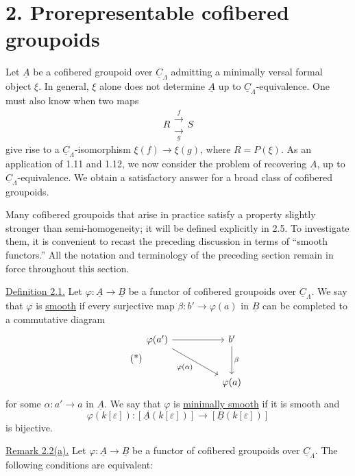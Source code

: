 \section*{2. Prorepresentable cofibered groupoids}

Let $\underline A$ be a cofibered groupoid over
$\underline C_\Lambda$ admitting a minimally versal formal object
$\xi$. In general, $\xi$ alone does not determine $\underline A$ up
to $\underline C_\Lambda$-equivalence. One must also know when two
maps
\[
 R\mathrel{\substack{\xrightarrow{\ f\ }\\[-.6ex]
                      \xrightarrow[\ g\ ]{}}}S
\]
give rise to a $\underline C_\Lambda$-isomorphism
$\xi(f)\longrightarrow\xi(g)$, where $R=P(\xi)$. As an application
of 1.11 and 1.12, we now consider the problem of recovering
$\underline A$, up to $\underline C_\Lambda$-equivalence. We obtain
a satisfactory answer for a broad class of cofibered groupoids.


Many cofibered groupoids that arise in practice satisfy a property
slightly stronger than semi-homogeneity; it will be defined
explicitly in 2.5. To investigate them, it is convenient to recast
the preceding discussion in terms of ``smooth functors.'' All the
notation and terminology of the preceding section remain in force
throughout this section.

\underline{Definition 2.1.} Let
$\varphi:\underline A\longrightarrow\underline B$ be a functor of
cofibered groupoids over $\underline C_\Lambda$. We say that
$\varphi$ is \underline{smooth} if every surjective map
$\beta:b'\longrightarrow\varphi(a)$ in $\underline B$ can be
completed to a commutative diagram
\begin{equation}\tag{*}
\begin{tikzcd}[row sep=large,column sep=huge]
 \varphi(a') \arrow[r] \arrow[dr,"{\varphi(\alpha)}"']
 & b' \arrow[d,"\beta"]\\
 & \varphi(a)
\end{tikzcd}
\end{equation}
for some $\alpha:a'\longrightarrow a$ in $\underline A$. We say
that $\varphi$ is \underline{minimally smooth} if it is smooth and
\[
 \varphi(k[\varepsilon]):
 [\underline A(k[\varepsilon])]
 \longrightarrow
 [\underline B(k[\varepsilon])]
\]
is bijective.

\underline{Remark 2.2(a).} Let
$\varphi:\underline A\longrightarrow\underline B$ be a functor of
cofibered groupoids over $\underline C_\Lambda$. The following
conditions are equivalent:

